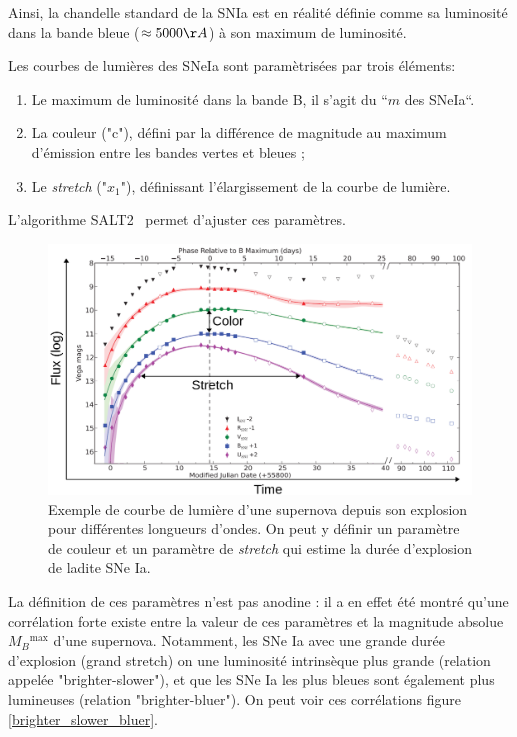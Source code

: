 \documentclass[a4paper, 12pt, svgnames]{article}
\newcommand{\mr}[1]{{\textcolor[rgb]{0.80,0.10,0.1}{#1}}}
\begin{document}
\mr{Ainsi, la chandelle standard de la SNIa est en réalité définie comme sa
luminosité dans la bande bleue ($\approx5000\AA$) à son maximum de luminosité}.

\mr{Les courbes de lumières des SNeIa sont paramètrisées par trois éléments:}

\begin{enumerate}
    \item \mr{Le maximum de luminosité dans la bande B, il s'agit du “$m$ des
        SNeIa“.}
    \item La couleur ("c"), défini par la différence de magnitude au maximum
        d'émission entre les bandes vertes et bleues ;
    \item Le \textit{stretch} ("$x_1$"), définissant l'élargissement de la
        courbe de lumière.
\end{enumerate}

L'algorithme SALT2~\cite{guy_salt2_2007, guy_supernova_2010} permet d'ajuster
ces paramètres.

\begin{figure}[htbp!]
    \centering
    \includegraphics[width=.5\linewidth]{Rapport_figures/lightcurve.png}
    \captionsetup{justification=centering}
    \caption{Exemple de courbe de lumière d'une supernova depuis son explosion
    pour différentes longueurs d'ondes. On peut y définir un paramètre de
couleur et un paramètre de \textit{stretch} qui estime la durée d'explosion de
ladite SNe Ia.}
    \label{lightcurves}
\end{figure}

La définition de ces paramètres n'est pas anodine : il a en effet été montré
qu'une corrélation forte existe entre la valeur de ces paramètres et la
magnitude absolue $M_B{}^{\text{max}}$ d'une supernova. Notamment, les SNe Ia
avec une grande durée d'explosion (grand stretch) on une luminosité intrinsèque
plus grande (relation appelée "brighter-slower"), et que les SNe Ia les plus
bleues sont également plus lumineuses (relation "brighter-bluer"). On peut voir
ces corrélations figure \ref{brighter_slower_bluer}.
\end{document}
